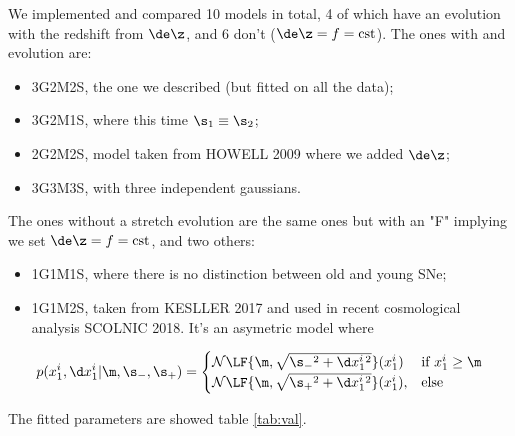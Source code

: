 \documentclass[bibnumber]{aa}
\begin{document}
We implemented and compared 10 models in total, 4 of which have an
evolution with the redshift from $\de\z$, and 6 don't ($\de\z = f =
\mathrm{cst}$). The ones with and evolution are:
\begin{itemize}
    \item 3G2M2S, the one we described (but fitted on all the data);
    \item 3G2M1S, where this time $\s_1 \equiv \s_2$;
    \item 2G2M2S, model taken from HOWELL 2009 where we added $\de\z$;
    \item 3G3M3S, with three independent gaussians.
\end{itemize}
The ones without a stretch evolution are the same ones but with an "F" implying
we set $\de\z = f = \mathrm{cst}$, and two others:
\begin{itemize}
    \item 1G1M1S, where there is no distinction between old and young SNe;
    \item 1G1M2S, taken from KESLLER 2017 and used in recent cosmological
        analysis SCOLNIC 2018. It's an asymetric model where
\end{itemize}
\begin{align}
 p(x_1^i, \d x_1^i | \m, \s_-, \s_+) = 
    \begin{cases}
        \mathcal{N} \LF{\m, \sqrt{\s_-{}^2 + \d x_1^i{}^{2}}} (x_1^i) & \text{if
        } x_1^i\geq \m\\
        \mathcal{N} \LF{\m, \sqrt{\s_+{}^2 + \d x_1^i{}^{2}}} (x_1^i), &
        \text{else}
    \end{cases}
\end{align} 

The fitted parameters are showed table \ref{tab:val}.
\end{document}
